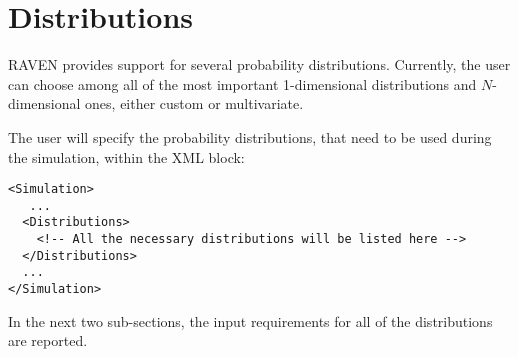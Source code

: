 \section{Distributions \\ \vspace{2 mm}}
\label{sec:distributions}
\newcommand{\distname}[1]{\textbf{#1}}
\newcommand{\distattrib}[1]{\textit{#1}}

\newcommand{\nameDescription}{\xmlAttr{name},
  \xmlDesc{required string attribute}, user-defined name of this distribution.
  \nb As with other objects, this identifier can be used to reference this
  specific entity from other input blocks in the XML.}
\newcommand{\specBlock}[2]{The specifications of this distribution must be
  defined within #1 \xmlNode{#2} XML block.}
\newcommand{\attrIntro}{This XML node accepts one attribute:}
\newcommand{\attrsIntro}{This XML node accepts the following attributes:}
\newcommand{\subnodeIntro}{This distribution can be initialized with the
  following child:}
\newcommand{\subnodesIntro}{This distribution can be initialized with the
  following children:}


RAVEN provides support for several probability distributions.
%
Currently, the user can choose among all of the most important 1-dimensional
distributions and $N$-dimensional ones, either custom or multivariate.

The user will specify the probability distributions, that need to be used during
the simulation, within the  XML block:
\begin{lstlisting}[style=XML]
<Simulation>
   ...
  <Distributions>
    <!-- All the necessary distributions will be listed here -->
  </Distributions>
  ...
</Simulation>
\end{lstlisting}

In the next two sub-sections, the input requirements for all of the
distributions are reported.

